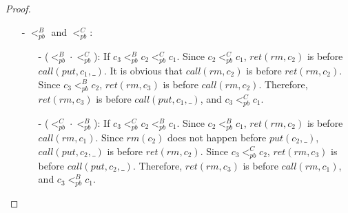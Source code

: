 \begin {proof}
\begin{itemize}
\begin{itemize}
    \item[-] ($<_{\textit{pb}}^C \cdot <_{\textit{pb}}^A$): If $c_3 <_{\textit{pb}}^C c_2 <_{\textit{pb}}^A c_1$. Since $c_2 <_{\textit{pb}}^A c_1$, $\textit{ret}(\textit{put},c_2)$ is before $\textit{call}(\textit{put},c_1,\_)$. It is obvious that $\textit{call}(\textit{put},c_2,\_)$ is before $\textit{ret}(\textit{put},c_2)$. Since $c_3 <_{\textit{pb}}^C c_2$, $\textit{ret}(\textit{rm},c_3)$ is before $\textit{call}(\textit{put},c_2,\_)$. Therefore, $\textit{ret}(\textit{rm},c_3)$ is before $\textit{call}(\textit{put},c_1,\_)$, and $c_3 <_{\textit{pb}}^C c_1$.

    \end{itemize}

\item[-] $<_{\textit{pb}}^B$ and $<_{\textit{pb}}^C$:

    \begin{itemize}
    \setlength{\itemsep}{0.5pt}
    \item[-] ($<_{\textit{pb}}^B \cdot <_{\textit{pb}}^C$): If $c_3 <_{\textit{pb}}^B c_2 <_{\textit{pb}}^C c_1$. Since $c_2 <_{\textit{pb}}^C c_1$, $\textit{ret}(\textit{rm},c_2)$ is before $\textit{call}(\textit{put},c_1,\_)$. It is obvious that $\textit{call}(\textit{rm},c_2)$ is before $\textit{ret}(\textit{rm},c_2)$. Since $c_3 <_{\textit{pb}}^B c_2$, $\textit{ret}(\textit{rm},c_3)$ is before $\textit{call}(\textit{rm},c_2)$. Therefore, $\textit{ret}(\textit{rm},c_3)$ is before $\textit{call}(\textit{put},c_1,\_)$, and $c_3 <_{\textit{pb}}^C c_1$.

    \item[-] ($<_{\textit{pb}}^C \cdot <_{\textit{pb}}^B$): If $c_3 <_{\textit{pb}}^C c_2 <_{\textit{pb}}^B c_1$. Since $c_2 <_{\textit{pb}}^B c_1$, $\textit{ret}(\textit{rm},c_2)$ is before $\textit{call}(\textit{rm},c_1)$. Since $\textit{rm}(c_2)$ does not happen before $\textit{put}(c_2,\_)$, $\textit{call}(\textit{put},c_2,\_)$ is before $\textit{ret}(\textit{rm},c_2)$. Since $c_3 <_{\textit{pb}}^C c_2$, $\textit{ret}(\textit{rm},c_3)$ is before $\textit{call}(\textit{put},c_2,\_)$. Therefore, $\textit{ret}(\textit{rm},c_3)$ is before $\textit{call}(\textit{rm},c_1)$, and $c_3 <_{\textit{pb}}^B c_1$.
    \end{itemize}


\end{itemize}
\end{proof}
